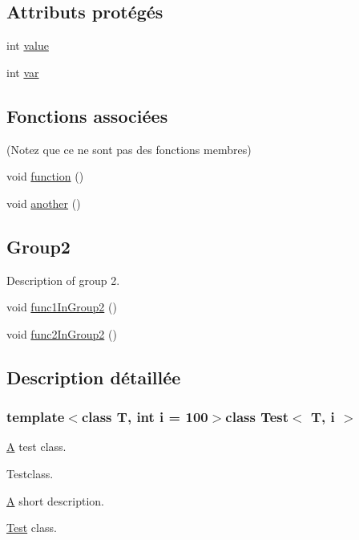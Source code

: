 \subsection*{Attributs protégés}
\begin{DoxyCompactItemize}
\item 
int \hyperlink{class_test_aefcbb7ead19f2c28a71a3a3f26cef6cb}{value}
\item 
int \hyperlink{class_test_ae75d55c8cf6390227d51c0965a4de296}{var}
\end{DoxyCompactItemize}
\subsection*{Fonctions associées}
(Notez que ce ne sont pas des fonctions membres) \begin{DoxyCompactItemize}
\item 
void \hyperlink{class_test_a51a683fa4fcec142ab1574e00a7b6860}{function} ()
\item 
void \hyperlink{class_test_a1283d836e0611ff772c1b06a31ecbbfe}{another} ()
\end{DoxyCompactItemize}
\subsection*{Group2}
\label{_amgrp6be2faefeff8740e94471f5ae04da6d0}%
Description of group 2. \begin{DoxyCompactItemize}
\item 
void \hyperlink{class_test_a627da802edbda6cebe0849202e3da85e}{func1\+In\+Group2} ()
\item 
void \hyperlink{class_test_ae6d5e6f9e0d9ac70e976be7476499b74}{func2\+In\+Group2} ()
\end{DoxyCompactItemize}


\subsection{Description détaillée}
\subsubsection*{template$<$class T, int i = 100$>$class Test$<$ T, i $>$}

\hyperlink{class_a}{A} test class. 

Testclass.

\hyperlink{class_a}{A} short description.

\hyperlink{class_test}{Test} class.

